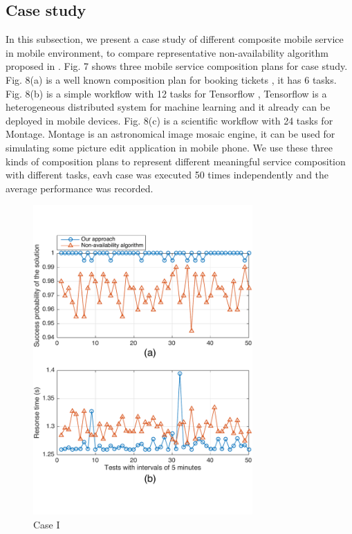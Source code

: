 \documentclass[journal]{IEEEtran}
\begin{document}
\subsection{Case study}
In this subsection, we present a case study of different composite mobile service in mobile environment, to compare representative non-availability algorithm proposed in \cite{Deng2017} \cite{sadiq2015service}. Fig. 7 shows three mobile service composition plans for case study. Fig. 8(a) is a well known composition plan for booking tickets \cite{wu2013transactional}, it has 6 tasks. Fig. 8(b) is a simple workflow with 12 tasks for Tensorflow \cite{abadi2016tensorflow}, Tensorflow is a heterogeneous distributed system for machine learning and it already can be deployed in mobile devices. Fig. 8(c) is a scientific workflow with 24 tasks for Montage. Montage is an astronomical image mosaic engine, it can be used for simulating some picture edit application in mobile phone. We use these three kinds of composition plans to represent different meaningful service composition with different tasks, eavh case was executed 50 times independently and the average performance was recorded.

\begin{figure}[!t]
\centering
\includegraphics[width=3.3in]{./img/Task-6.pdf}
\caption{Case I}
\label{Task-6}
\end{figure}
\end{document}
